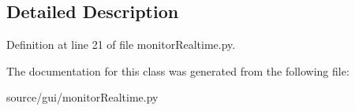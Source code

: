 \subsection{Detailed Description}


Definition at line 21 of file monitor\+Realtime.\+py.



The documentation for this class was generated from the following file\+:\begin{DoxyCompactItemize}
\item 
source/gui/monitor\+Realtime.\+py\end{DoxyCompactItemize}
